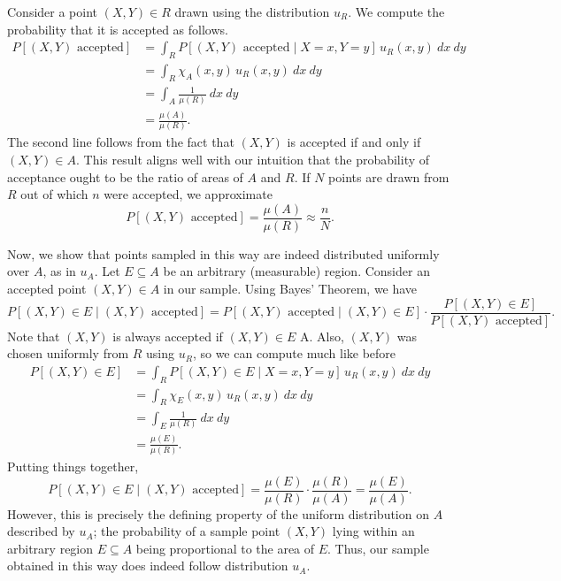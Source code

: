 \documentclass[10pt]{article}
\begin{document}
    Consider a point $(X, Y) \in R$ drawn using the distribution $u_R$. We
    compute the probability that it is accepted as follows. \begin{align*}
        P[(X, Y) \text{ accepted}] &= \int_R P[(X, Y)\text{ accepted} \mid X = x, Y =
        y]\, u_R(x, y)\:dx\:dy \\
        &= \int_R \chi_A(x, y)\,u_R(x, y)\:dx\:dy \\
        &= \int_A \frac{1}{\mu(R)}\:dx\:dy \\
        &= \frac{\mu(A)}{\mu(R)}.
    \end{align*}
    The second line follows from the fact that $(X, Y)$ is accepted if and only if
    $(X, Y) \in A$. This result aligns well with our intuition that the probability
    of acceptance ought to be the ratio of areas of $A$ and $R$. If $N$ points are
    drawn from $R$ out of which $n$ were accepted, we approximate \[
        P[(X, Y) \text{ accepted}] = \frac{\mu(A)}{\mu(R)} \approx \frac{n}{N}.
    \]

    Now, we show that points sampled in this way are indeed distributed uniformly
    over $A$, as in $u_A$. Let $E\subseteq A$ be an arbitrary (measurable) region.
    Consider an accepted point $(X, Y) \in A$ in our sample. Using Bayes' Theorem,
    we have \[
        P[(X, Y) \in E \mid (X, Y) \text{ accepted}] = P[(X, Y) \text{ accepted} \mid
        (X, Y) \in E]\cdot \frac{P[(X, Y) \in E]}{P[(X, Y) \text{ accepted}]}.
    \] Note that $(X, Y)$ is always accepted if $(X, Y) \in E$ \subseteq A. Also,
    $(X, Y)$ was chosen uniformly from $R$ using $u_R$, so we can compute much like
    before
    \begin{align*}
        P[(X, Y) \in E] &= \int_R P[(X, Y) \in E\mid X = x, Y = y]\, u_R(x,
        y)\:dx\:dy \\
        &= \int_R \chi_E(x, y)\,u_R(x, y)\:dx\:dy \\
        &= \int_E \frac{1}{\mu(R)}\:dx\:dy \\
        &= \frac{\mu(E)}{\mu(R)}.
    \end{align*}
    Putting things together, \[
        P[(X, Y) \in E \mid (X, Y) \text{ accepted}] = \frac{\mu(E)}{\mu(R)}\cdot
        \frac{\mu(R)}{\mu(A)} = \frac{\mu(E)}{\mu(A)}.
    \] However, this is precisely the defining property of the uniform distribution
    on $A$ described by $u_A$; the probability of a sample point $(X, Y)$ lying
    within an arbitrary region $E \subseteq A$ being proportional to the area of $E$.
    Thus, our sample obtained in this way does indeed follow distribution $u_A$.
\end{document}
